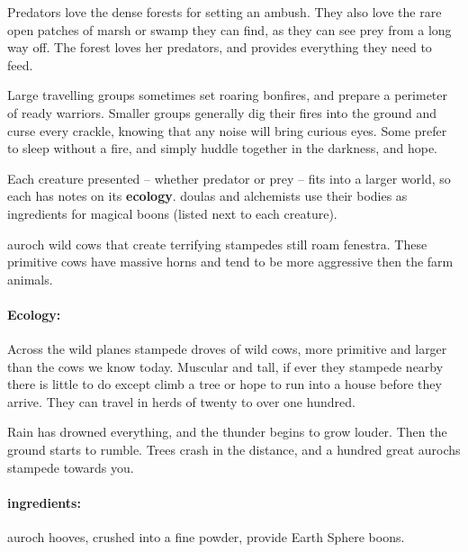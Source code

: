 \begin{multicols}{2}

\noindent
Predators love the dense forests for setting an ambush.
They also love the rare open patches of marsh or swamp they can find, as they can see prey from a long way off.
The forest loves her predators, and provides everything they need to feed.

Large travelling groups sometimes set roaring bonfires, and prepare a perimeter of ready warriors.
Smaller groups generally dig their fires into the ground and curse every crackle, knowing that any noise will bring curious eyes.
Some prefer to sleep without a fire, and simply huddle together in the darkness, and hope.

Each creature presented -- whether predator or prey -- fits into a larger world, so each has notes on its \textbf{ecology}.
\Glspl{doula} and alchemists use their bodies as \glspl{ingredient} for magical \glspl{boon} (listed next to each creature).

  {auroch}%
  {wild cows that create terrifying stampedes}%
still roam \gls{fenestra}.
These primitive cows have massive horns and tend to be more aggressive then the farm animals.


\paragraph{Ecology:} Across the wild planes stampede droves of wild cows, more primitive and larger than the cows we know today.
Muscular and tall, if ever they stampede nearby there is little to do except climb a tree or hope to run into a house before they arrive.
They can travel in herds of twenty to over one hundred.

\begin{boxtext}
  Rain has drowned everything, and the thunder begins to grow louder.
  Then the ground starts to rumble.
  Trees crash in the distance, and a hundred great aurochs stampede towards you.
\end{boxtext}

\paragraph{\Glspl{ingredient}:}
auroch hooves, crushed into a fine powder, provide Earth Sphere \glspl{boon}.

\showEnc


\end{multicols}
